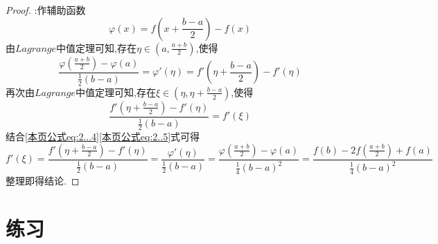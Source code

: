 \documentclass[lang=cn,newtx,10pt,scheme=chinese]{../Template/elegantbook}
\begin{document}
\begin{example}
\begin{proof}
        {\color{blue} }:作辅助函数
        \begin{equation}
            \varphi \left( x \right) =f\left( x+\frac{b-a}{2} \right) -f\left( x \right)
        \nonumber
        \end{equation}
        由$Lagrange$中值定理可知,存在$\eta \in \left( a,\frac{a+b}{2} \right)$,使得
        \begin{equation}\label{本页公式eq:2...4}
            \frac{\varphi \left( \frac{a+b}{2} \right) -\varphi \left( a \right)}{\frac{1}{2}\left( b-a \right)}=\varphi '\left( \eta \right) =f'\left( \eta +\frac{b-a}{2} \right) -f'\left( \eta \right) 
        \end{equation}
        再次由$Lagrange$中值定理可知,存在$\xi \in \left( \eta ,\eta +\frac{b-a}{2} \right)$,使得
        \begin{equation}\label{本页公式eq:2..5}
            \frac{f'\left( \eta +\frac{b-a}{2} \right) -f'\left( \eta \right)}{\frac{1}{2}\left( b-a \right)}=f'\left( \xi \right) 
        \end{equation}
        结合\eqref{本页公式eq:2...4}\eqref{本页公式eq:2..5}式可得
        \begin{equation}
            f'\left( \xi \right) =\frac{f'\left( \eta +\frac{b-a}{2} \right) -f'\left( \eta \right)}{\frac{1}{2}\left( b-a \right)}=\frac{\varphi '\left( \eta \right)}{\frac{1}{2}\left( b-a \right)}=\frac{\varphi \left( \frac{a+b}{2} \right) -\varphi \left( a \right)}{\frac{1}{4}\left( b-a \right) ^2}=\frac{f\left( b \right) -2f\left( \frac{a+b}{2} \right) +f\left( a \right)}{\frac{1}{4}\left( b-a \right) ^2}
            \nonumber
        \end{equation}
        整理即得结论.

    \end{proof}
\end{example}

\section{练习}
\end{document}
